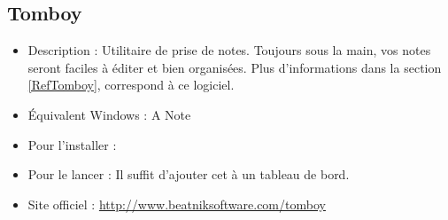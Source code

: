 \subsection{Tomboy}
\begin{itemize}
\begingroup
{}
\item Description : Utilitaire de prise de notes. Toujours sous la main, vos notes seront faciles à éditer et bien organisées. Plus d'informations dans la section \ref{RefTomboy}, correspond à ce logiciel.{\par}
\endgroup
\item Équivalent Windows : A Note{\par}
\item Pour l'installer : 
\item Pour le lancer : Il suffit d'ajouter cet  à un tableau de bord.{\par}
\item Site officiel : \url{http://www.beatniksoftware.com/tomboy}{\par}
\end{itemize}
